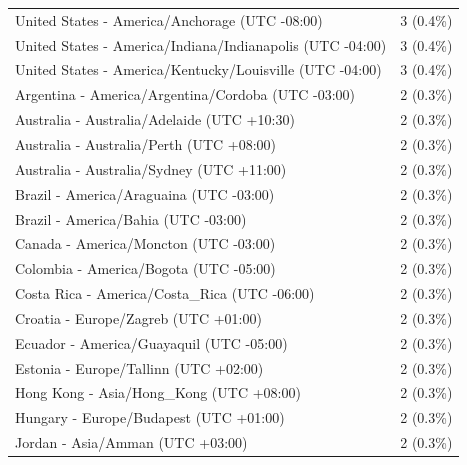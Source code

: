 \begin{appendix}
\begin{table}
{\begin{tabular}[t]{ll}
\hspace{1em}United States - America/Anchorage (UTC -08:00) & 3 (0.4\%)\\
\hspace{1em}United States - America/Indiana/Indianapolis (UTC -04:00) & 3 (0.4\%)\\
\hspace{1em}United States - America/Kentucky/Louisville (UTC -04:00) & 3 (0.4\%)\\
\hspace{1em}Argentina - America/Argentina/Cordoba (UTC -03:00) & 2 (0.3\%)\\
\hspace{1em}Australia - Australia/Adelaide (UTC +10:30) & 2 (0.3\%)\\
\addlinespace
\hspace{1em}Australia - Australia/Perth (UTC +08:00) & 2 (0.3\%)\\
\hspace{1em}Australia - Australia/Sydney (UTC +11:00) & 2 (0.3\%)\\
\hspace{1em}Brazil - America/Araguaina (UTC -03:00) & 2 (0.3\%)\\
\hspace{1em}Brazil - America/Bahia (UTC -03:00) & 2 (0.3\%)\\
\hspace{1em}Canada - America/Moncton (UTC -03:00) & 2 (0.3\%)\\
\addlinespace
\hspace{1em}Colombia - America/Bogota (UTC -05:00) & 2 (0.3\%)\\
\hspace{1em}Costa Rica - America/Costa\_Rica (UTC -06:00) & 2 (0.3\%)\\
\hspace{1em}Croatia - Europe/Zagreb (UTC +01:00) & 2 (0.3\%)\\
\hspace{1em}Ecuador - America/Guayaquil (UTC -05:00) & 2 (0.3\%)\\
\hspace{1em}Estonia - Europe/Tallinn (UTC +02:00) & 2 (0.3\%)\\
\addlinespace
\hspace{1em}Hong Kong - Asia/Hong\_Kong (UTC +08:00) & 2 (0.3\%)\\
\hspace{1em}Hungary - Europe/Budapest (UTC +01:00) & 2 (0.3\%)\\
\hspace{1em}Jordan - Asia/Amman (UTC +03:00) & 2 (0.3\%)\\

\end{tabular}}
\end{table}
\end{appendix}
